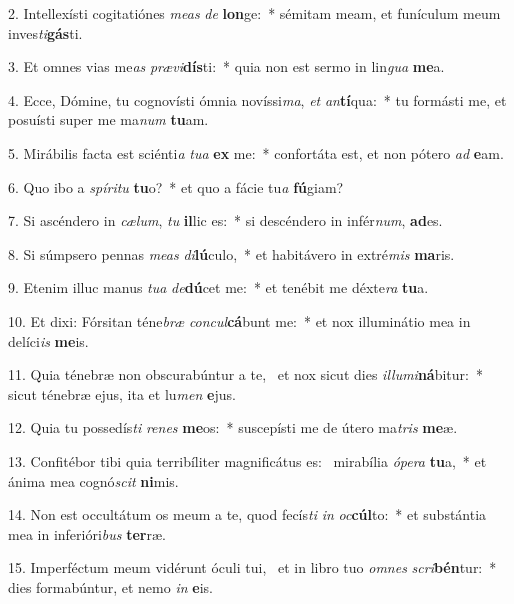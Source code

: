 2. Intellexísti cogitatiónes \textit{me}\textit{as} \textit{de} \textbf{lon}ge:~*  sémitam meam, et funículum meum inves\textit{ti}\textbf{gás}ti.\

3. Et omnes vias me\textit{as} \textit{præ}\textit{vi}\textbf{dís}ti:~*  quia non est sermo in lin\textit{gua} \textbf{me}a.\

4. Ecce, Dómine, tu cognovísti ómnia novíssi\textit{ma}, \textit{et} \textit{an}\textbf{tí}qua:~*  tu formásti me, et posuísti super me ma\textit{num} \textbf{tu}am.\

5. Mirábilis facta est sciénti\textit{a} \textit{tu}\textit{a} \textbf{ex} me:~*  confortáta est, et non pótero \textit{ad} \textbf{e}am.\

6. Quo ibo a \textit{spí}\textit{ri}\textit{tu} \textbf{tu}o?~*  et quo a fácie tu\textit{a} \textbf{fú}giam?\

7. Si ascéndero in \textit{cæ}\textit{lum}, \textit{tu} \textbf{il}lic es:~*  si descéndero in infér\textit{num}, \textbf{ad}es.\

8. Si súmpsero pennas \textit{me}\textit{as} \textit{di}\textbf{lú}culo,~*  et habitávero in extré\textit{mis} \textbf{ma}ris.\

9. Etenim illuc manus \textit{tu}\textit{a} \textit{de}\textbf{dú}cet me:~*  et tenébit me déxte\textit{ra} \textbf{tu}a.\

10. Et dixi: Fórsitan téne\textit{bræ} \textit{con}\textit{cul}\textbf{cá}bunt me:~*  et nox illuminátio mea in delíci\textit{is} \textbf{me}is.\

11. Quia ténebræ non obscurabúntur a te, \dag\  et nox sicut dies \textit{il}\textit{lu}\textit{mi}\textbf{ná}bitur:~*  sicut ténebræ ejus, ita et lu\textit{men} \textbf{e}jus.\

12. Quia tu possedís\textit{ti} \textit{re}\textit{nes} \textbf{me}os:~*  suscepísti me de útero ma\textit{tris} \textbf{me}æ.\

13. Confitébor tibi quia terribíliter magnificátus es: \dag\  mirabília \textit{ó}\textit{pe}\textit{ra} \textbf{tu}a,~*  et ánima mea cognó\textit{scit} \textbf{ni}mis.\

14. Non est occultátum os meum a te, quod fecís\textit{ti} \textit{in} \textit{oc}\textbf{cúl}to:~*  et substántia mea in inferióri\textit{bus} \textbf{ter}ræ.\

15. Imperféctum meum vidérunt óculi tui, \dag\  et in libro tuo \textit{om}\textit{nes} \textit{scri}\textbf{bén}tur:~*  dies formabúntur, et nemo \textit{in} \textbf{e}is.\

